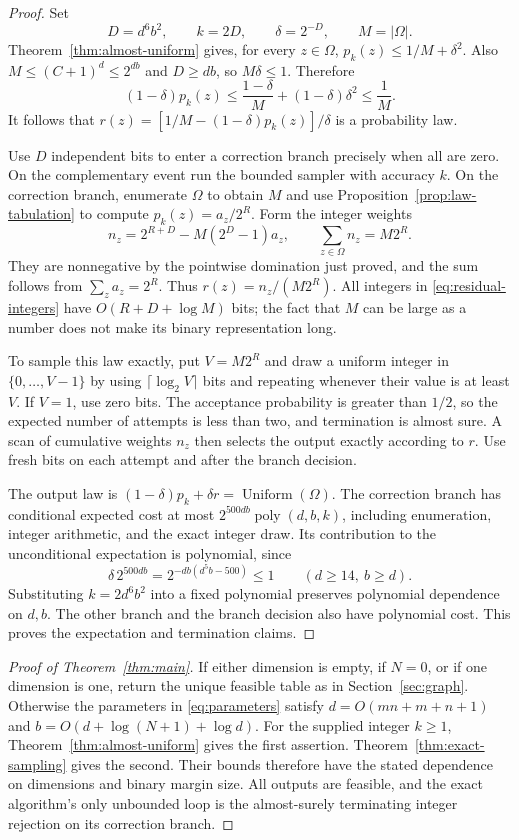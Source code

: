 \begin{proof}
Set
\[
 D=d^6b^2,\qquad k=2D,\qquad\delta=2^{-D},\qquad M=|\Omega|.
\]
Theorem~\ref{thm:almost-uniform} gives, for every $z\in\Omega$,
$p_k(z)\le1/M+\delta^2$. Also $M\le(C+1)^d\le2^{db}$ and $D\ge db$,
so $M\delta\le1$. Therefore
\[
 (1-\delta)p_k(z)
 \le\frac{1-\delta}{M}+(1-\delta)\delta^2
 \le\frac1M.
\]
It follows that
$r(z)=[1/M-(1-\delta)p_k(z)]/\delta$ is a probability law.

Use $D$ independent bits to enter a correction branch precisely when
all are zero. On the complementary event run the bounded sampler with
accuracy $k$. On the correction branch, enumerate $\Omega$ to obtain
$M$ and use Proposition~\ref{prop:law-tabulation} to compute
$p_k(z)=a_z/2^R$. Form the integer weights
\begin{equation}\label{eq:residual-integers}
 n_z=2^{R+D}-M(2^D-1)a_z,
 \qquad \sum_{z\in\Omega}n_z=M2^R.
\end{equation}
They are nonnegative by the pointwise domination just proved, and the
sum follows from $\sum_z a_z=2^R$. Thus $r(z)=n_z/(M2^R)$.
All integers in \eqref{eq:residual-integers} have
$O(R+D+\log M)$ bits; the fact that $M$ can be large as a number does not
make its binary representation long.

To sample this law exactly, put $V=M2^R$ and draw a uniform integer in
$\{0,\ldots,V-1\}$ by using $\lceil\log_2V\rceil$ bits and repeating
whenever their value is at least $V$. If $V=1$, use zero bits.
The acceptance probability is greater than $1/2$, so the expected number
of attempts is less than two, and termination is almost sure. A scan of
cumulative weights $n_z$ then selects the output exactly according to
$r$. Use fresh bits on each attempt and after the branch decision.

The output law is
$(1-\delta)p_k+\delta r=\operatorname{Uniform}(\Omega)$.
The correction branch has conditional expected cost at most
$2^{500db}\operatorname{poly}(d,b,k)$, including enumeration, integer
arithmetic, and the exact integer draw. Its contribution to the
unconditional expectation is polynomial, since
\[
 \delta\,2^{500db}
 =2^{-db(d^5b-500)}\le1
 \qquad(d\ge14,\ b\ge d).
\]
Substituting $k=2d^6b^2$ into a fixed polynomial preserves polynomial
dependence on $d,b$. The other branch and the branch decision also have
polynomial cost. This proves the expectation and termination claims.
\end{proof}

\begin{proof}[Proof of Theorem~\ref{thm:main}]
If either dimension is empty, if $N=0$, or if one dimension is one,
return the unique feasible table as in Section~\ref{sec:graph}.
Otherwise the parameters in \eqref{eq:parameters} satisfy
$d=O(mn+m+n+1)$ and $b=O(d+\log(N+1)+\log d)$.
For the supplied integer $k\ge1$, Theorem~\ref{thm:almost-uniform}
gives the first assertion. Theorem~\ref{thm:exact-sampling} gives the
second. Their bounds therefore have the stated dependence on dimensions
and binary margin size. All outputs are feasible, and the exact
algorithm's only unbounded loop is the almost-surely terminating integer
rejection on its correction branch.
\end{proof}
